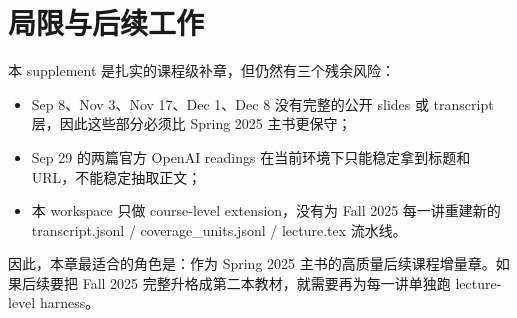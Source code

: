 \documentclass[11pt]{ctexbook}
\begin{document}
\section{局限与后续工作}

本 supplement 是扎实的课程级补章，但仍然有三个残余风险：

\begin{itemize}
\item Sep 8、Nov 3、Nov 17、Dec 1、Dec 8 没有完整的公开 slides 或 transcript 层，因此这些部分必须比 Spring 2025 主书更保守；
\item Sep 29 的两篇官方 OpenAI readings 在当前环境下只能稳定拿到标题和 URL，不能稳定抽取正文；
\item 本 workspace 只做 course-level extension，没有为 Fall 2025 每一讲重建新的 transcript.jsonl / coverage\_units.jsonl / lecture.tex 流水线。
\end{itemize}

因此，本章最适合的角色是：作为 Spring 2025 主书的高质量后续课程增量章。如果后续要把 Fall 2025 完整升格成第二本教材，就需要再为每一讲单独跑 lecture-level harness。
\end{document}
